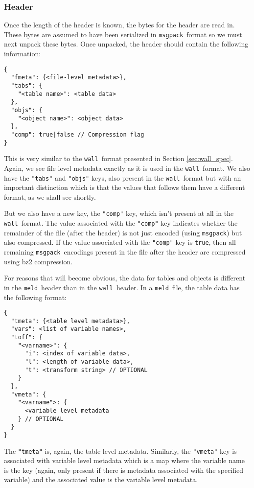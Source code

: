 \documentclass[11pt,a4paper,twocolumn]{article}
\newcommand{\wall}{\texttt{wall}}
\newcommand{\meld}{\texttt{meld}}
\newcommand{\msgpack}{\texttt{msgpack}}
\newcommand{\code}[1]{\texttt{#1}} %
\begin{document}
\subsubsection{Header}
\label{sec:meld_head}

Once the length of the header is known, the bytes for the header are
read in.  These bytes are assumed to have been serialized in
\msgpack\ format so we must next unpack these bytes.  Once unpacked,
the header should contain the following information:

\begin{verbatim}
{
  "fmeta": {<file-level metadata>},
  "tabs": {
    "<table name>": <table data>
  },
  "objs": {
    "<object name>": <object data>
  },
  "comp": true|false // Compression flag
}
\end{verbatim}

This is very similar to the \wall\ format presented in Section
\ref{sec:wall_spec}.  Again, we see file level metadata exactly as it
is used in the \wall\ format.  We also have the \code{"tabs"} and
\code{"objs"} keys, also present in the \wall\ format but with an
important distinction which is that the values that follows them have
a different format, as we shall see shortly.

But we also have a new key, the \code{"comp"} key, which isn't present
at all in the \wall\ format.  The value associated with the
\code{"comp"} key indicates whether the remainder of the file (after
the header) is not just encoded (using \msgpack) but also compressed.  If
the value associated with the \code{"comp"} key is \code{true}, then
all remaining \msgpack\ encodings present in the file after the header
are compressed using bz2\cite{BZ2} compression.

For reasons that will become obvious, the data for tables and objects
is different in the \meld\ header than in the \wall\ header.  In a
\meld\ file, the table data has the following format:

\begin{verbatim}
{
  "tmeta": {<table level metadata>},
  "vars": <list of variable names>,
  "toff": {
    "<varname>": {
      "i": <index of variable data>,
      "l": <length of variable data>,
      "t": <transform string> // OPTIONAL
    }
  },
  "vmeta": {
    "<varname">: {
      <variable level metadata
    } // OPTIONAL
  }
}
\end{verbatim}

The \code{"tmeta"} is, again, the table level metadata.  Similarly,
the \code{"vmeta"} key is associated with variable level metadata
which is a map where the variable name is the key (again, only present
if there is metadata associated with the specified variable) and the
associated value is the variable level metadata.
\end{document}
